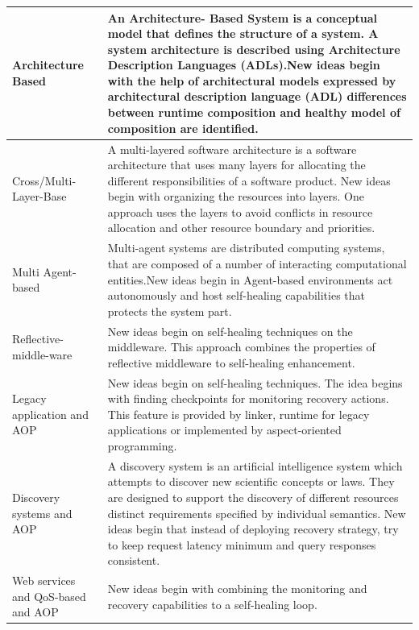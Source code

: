 \begin{center}
\begin{tabular}{ | p{3cm} | p{11cm} |}
 \\ \hline
    Architecture Based & An Architecture- Based System is a conceptual model that defines the structure of a system. A system architecture is described using Architecture Description Languages (ADLs).New ideas begin with the help of architectural models expressed by architectural description language (ADL) differences between runtime composition and healthy model of composition are identified. \\
    \hline
    Cross/Multi-Layer-Base & A multi-layered software architecture is a software architecture that uses many layers for allocating the different responsibilities of a software product. New ideas begin with organizing the resources into layers. One approach uses the layers to avoid conflicts in resource allocation and other resource boundary and priorities.  \\ \hline
        Multi Agent-based & Multi-agent systems are distributed computing systems, that are composed of a number of interacting computational entities.New ideas begin in Agent-based environments act autonomously and host self-healing capabilities that protects the system part. 
 \\ \hline
     Reflective-middle-ware & New ideas begin on self-healing techniques on the middleware. This approach combines the properties of reflective middleware to self-healing enhancement.
 \\ \hline
      Legacy application and AOP & New ideas begin on self-healing techniques. The idea begins with finding checkpoints for monitoring recovery actions. This feature is provided by linker, runtime for legacy applications or implemented by aspect-oriented programming.
 \\ \hline
  Discovery systems and AOP & A discovery system is an artificial intelligence system which attempts to discover new scientific concepts or laws.
They are designed to support the discovery of different resources distinct requirements specified by individual semantics. New ideas begin that instead of deploying recovery strategy, try to keep request latency minimum and query responses consistent.
  \\ \hline
   Web services and QoS-based and AOP & New ideas begin with combining the monitoring and recovery capabilities to a self-healing loop. 
    \end{tabular}
\end{center}





